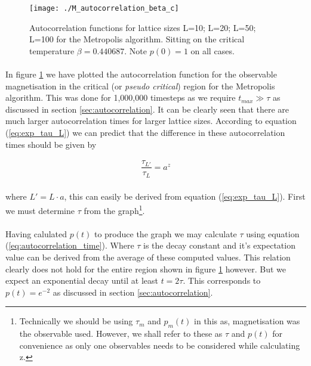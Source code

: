 \documentclass[12pt] {report} %
\begin{document}
			\begin{figure}[h]
				\centering
				\texttt{[image: ./M\_autocorrelation\_beta\_c]}
				\caption{Autocorrelation functions for lattice sizes L=10; L=20; L=50; L=100 for the Metropolis algorithm. Sitting on the critical temperature $\beta = 0.440687$. Note $p(0) = 1$ on all cases.}
				\label{fig:M_autocorrelation_beta_c}
			\end{figure}
			
			\paragraph{}
				In figure \ref{fig:M_autocorrelation_beta_c}  we have plotted the autocorrelation function for the observable magnetisation in the critical (or \textit{pseudo critical}) region for the Metropolis algorithm. This was done for 1,000,000 timesteps as we require $t_{max} \gg \tau$ as discussed in section \ref{sec:autocorrelation}. It can be clearly seen that there are much larger autocorrelation times for larger lattice sizes. According to equation (\ref{eq:exp_tau_L}) we can predict that the difference in these autocorrelation times should be given by
				
			\begin{align}
				\dfrac{\tau_{L'}}{\tau_{L}} = a^z	\label{eq:z_calculate}
			\end{align}

			\paragraph{}
				where $L' = L \cdot a$, this can easily be derived from equation (\ref{eq:exp_tau_L}).
				First we must determine $\tau$ from the graph\footnote{Technically we should be using $\tau_m$ and $p_m(t)$ in this as, magnetisation was the observable used. However, we shall refer to these as $\tau$ and $p(t)$ for convenience as only one observables needs to be considered while calculating z.}. 
				
			\paragraph{}
				Having calulated $p(t)$ to produce the graph we may calculate $\tau$ using equation (\ref{eq:autocorrelation_time}). Where $\tau$ is the decay constant and it's expectation value can be derived from the average of these computed values. This relation clearly does not hold for the entire region shown in figure \ref{fig:M_autocorrelation_beta_c} however. But we expect an exponential decay until at least $t = 2\tau$. This corresponds to $p(t)=e^{-2}$ as discussed in section \ref{sec:autocorrelation}. 
				
\end{document}
